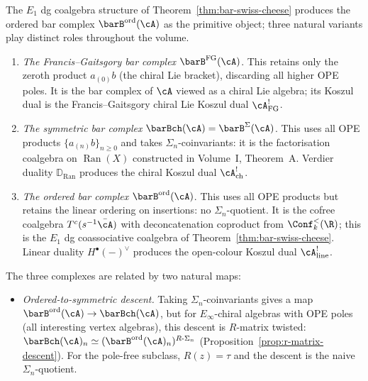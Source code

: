 \begin{remark}
\label{rem:three-bar-complexes}%
%
The $E_1$ dg coalgebra structure of
Theorem~\ref{thm:bar-swiss-cheese} produces the ordered bar complex
$\barB^{\mathrm{ord}}(\cA)$ as the primitive object; three
natural variants play distinct roles
throughout the volume.
\begin{enumerate}[label=\textup{(\roman*)}]
\item \emph{The Francis--Gaitsgory bar complex}
 $\barB^{\mathrm{FG}}(\cA)$. This retains only the zeroth
 product $a_{(0)}b$ (the chiral Lie bracket), discarding all
 higher OPE poles. It is the bar complex of $\cA$ viewed as a
 chiral Lie algebra; its Koszul dual is the Francis--Gaitsgory
 chiral Lie Koszul dual $\cA^!_{\mathrm{FG}}$.

\item \emph{The symmetric bar complex}
 $\barBch(\cA) = \barB^{\Sigma}(\cA)$. This uses all OPE
 products $\{a_{(n)}b\}_{n \ge 0}$ and takes
 $\Sigma_n$-coinvariants: it is the factorisation coalgebra on
 $\operatorname{Ran}(X)$ constructed in Volume~I, Theorem~A\@.
 Verdier duality $\mathbb{D}_{\operatorname{Ran}}$ produces the
 chiral Koszul dual $\cA^!_{\mathrm{ch}}$.

\item \emph{The ordered bar complex}
 $\barB^{\mathrm{ord}}(\cA)$. This uses all OPE products but
 retains the linear ordering on insertions: no
 $\Sigma_n$-quotient. It is the cofree coalgebra
 $T^c(s^{-1}\bar{\cA})$ with deconcatenation coproduct from
 $\Conf_k^{<}(\R)$; this is the $E_1$ dg coassociative
 coalgebra of Theorem~\ref{thm:bar-swiss-cheese}. Linear duality
 $H^\bullet(-)^\vee$ produces the open-colour Koszul dual
 $\cA^!_{\mathrm{line}}$.
\end{enumerate}
The three complexes are related by two natural maps:
\begin{itemize}[nosep]
\item \emph{Ordered-to-symmetric descent.} Taking
 $\Sigma_n$-coinvariants gives a map
 $\barB^{\mathrm{ord}}(\cA) \to \barBch(\cA)$, but for
 $E_\infty$-chiral algebras with OPE poles (all interesting
 vertex algebras), this descent is $R$-matrix twisted:
 $\barBch(\cA)_n \simeq
 (\barB^{\mathrm{ord}}(\cA)_n)^{R\text{-}\Sigma_n}$
 (Proposition~\ref{prop:r-matrix-descent}). For the pole-free
 subclass, $R(z) = \tau$ and the descent is the naive
 $\Sigma_n$-quotient.


\end{itemize}
\end{remark}
